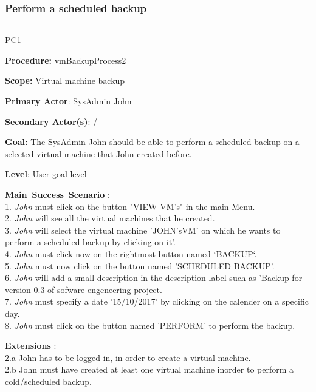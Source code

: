 \subsubsection{Perform a scheduled backup}

\hrule
\vspace{0.5cm}
\begin{lyxlist}{PC1}
\small{
\item [\textbf{Procedure:}] vmBackupProcess2
\item [\textbf{Scope:}] Virtual machine backup
\item [\textbf{Primary Actor}:] SysAdmin John 
\item [\textbf{Secondary Actor(s)}:] /
\item [\textbf{Goal:}] The SysAdmin John should be able to perform a
scheduled backup on a selected virtual machine that John created before.
\item [\textbf{Level}:] User-goal level
\item [\textbf{Main~Success~Scenario}]:\\
1. \emph{John} must click on the button "VIEW VM's" in the main
Menu.\\
2. \emph{John} will see all the virtual machines that he created.\\
3. \emph{John} will select the virtual machine 'JOHN'sVM' on which he wants
to perform a scheduled backup by clicking on it'.\\
4. \emph{John} must click now on the rightmost button named `BACKUP`.\\
5. \emph{John} must now click on the button named 'SCHEDULED
BACKUP'.\\
6. \emph{John} will add a small description in the description label such as
'Backup for version 0.3 of sofware engeneering project.\\
7. \emph{John} must specify a date '15/10/2017' by clicking on the calender on a
specific day.\\
8. \emph{John} must click on the button named 'PERFORM' to perform the backup.\\



\item [\textbf{Extensions}]:\\
2.a John has to be logged in, in order to create a virtual machine.\\
2.b John must have created at least one virtual machine inorder to perform a
cold/scheduled backup.\\

}
\end{lyxlist}
